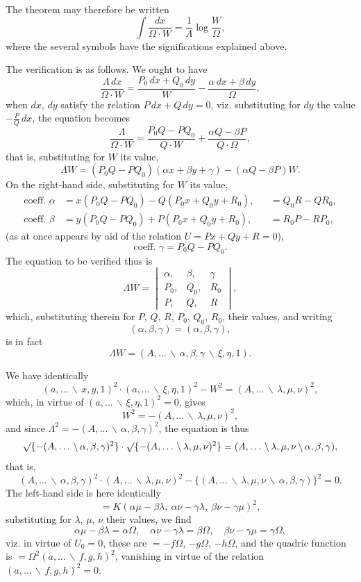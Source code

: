 \documentclass[12pt,a4paper]{article}
\theoremstyle{plain}
\theoremstyle{definition}
\theoremstyle{remark}
\begin{document}
The theorem may therefore be written
\[
\int \frac{dx}{\Omega \cdot W} = \frac{1}{\Lambda} \log \frac{W}{\Omega},
\]
where the several symbols have the significations explained above.

The verification is as follows. We ought to have
\[
\frac{\Lambda\, dx}{\Omega \cdot W} = \frac{P_0\, dx + Q_0\, dy}{W} - \frac{\alpha\, dx + \beta\, dy}{\Omega},
\]
when $dx$, $dy$ satisfy the relation $P\, dx + Q\, dy = 0$, viz. substituting for $dy$ the value $-\frac{P}{Q}\, dx$, the equation becomes
\[
\frac{\Lambda}{\Omega \cdot W} = \frac{P_0 Q - P Q_0}{Q \cdot W} + \frac{\alpha Q - \beta P}{Q \cdot \Omega},
\]
that is, substituting for $W$ its value,
\[
\Lambda W = (P_0 Q - P Q_0)(\alpha x + \beta y + \gamma) - (\alpha Q - \beta P)W.
\]
On the right-hand side, substituting for $W$ its value,
\begin{align*}
\text{coeff. } \alpha &= x(P_0 Q - P Q_0) - Q(P_0 x + Q_0 y + R_0), &&= Q_0 R - Q R_0, \\
\text{coeff. } \beta &= y(P_0 Q - P Q_0) + P(P_0 x + Q_0 y + R_0), &&= R_0 P - R P_0,
\end{align*}
(as at once appears by aid of the relation $U = Px + Qy + R = 0$),
\[
\text{coeff. } \gamma = P_0 Q - P Q_0.
\]
The equation to be verified thus is
\[
\Lambda W = \begin{vmatrix} \alpha, & \beta, & \gamma \\ P_0, & Q_0, & R_0 \\ P, & Q, & R \end{vmatrix},
\]
which, substituting therein for $P$, $Q$, $R$, $P_0$, $Q_0$, $R_0$, their values, and writing
\[
(\alpha, \beta, \gamma) = (\alpha, \beta, \gamma),
\]
is in fact
\[
\Lambda W = (A, \ldots \,\backslash\, \alpha, \beta, \gamma \,\backslash\, \xi, \eta, 1).
\]

We have identically
\[
(a, \ldots \,\backslash\, x, y, 1)^2 \cdot (a, \ldots \,\backslash\, \xi, \eta, 1)^2 - W^2 = (A, \ldots \,\backslash\, \lambda, \mu, \nu)^2,
\]
which, in virtue of $(a, \ldots \,\backslash\, \xi, \eta, 1)^2 = 0$, gives
\[
W^2 = -(A, \ldots \,\backslash\, \lambda, \mu, \nu)^2,
\]
and since $\Lambda^2 = -(A, \ldots \,\backslash\, \alpha, \beta, \gamma)^2$, the equation is thus
\[
\surd\{-(A, \ldots \,\backslash\, \alpha, \beta, \gamma)^2\} \cdot \surd\{-(A, \ldots \,\backslash\, \lambda, \mu, \nu)^2\} = (A, \ldots \,\backslash\, \lambda, \mu, \nu \,\backslash\, \alpha, \beta, \gamma),
\]
that is,
\[
(A, \ldots \,\backslash\, \alpha, \beta, \gamma)^2 \cdot (A, \ldots \,\backslash\, \lambda, \mu, \nu)^2 - \{(A, \ldots \,\backslash\, \lambda, \mu, \nu \,\backslash\, \alpha, \beta, \gamma)\}^2 = 0.
\]
The left-hand side is here identically
\[
= K(\alpha\mu - \beta\lambda,\ \alpha\nu - \gamma\lambda,\ \beta\nu - \gamma\mu)^2,
\]
substituting for $\lambda$, $\mu$, $\nu$ their values, we find
\[
\alpha\mu - \beta\lambda = \alpha\Omega, \quad \alpha\nu - \gamma\lambda = \beta\Omega, \quad \beta\nu - \gamma\mu = \gamma\Omega,
\]
viz. in virtue of $U_0 = 0$, these are $= -f\Omega$, $-g\Omega$, $-h\Omega$, and the quadric function is $= \Omega^2 (a, \ldots \,\backslash\, f, g, h)^2$, vanishing in virtue of the relation $(a, \ldots \,\backslash\, f, g, h)^2 = 0$.
\end{document}
